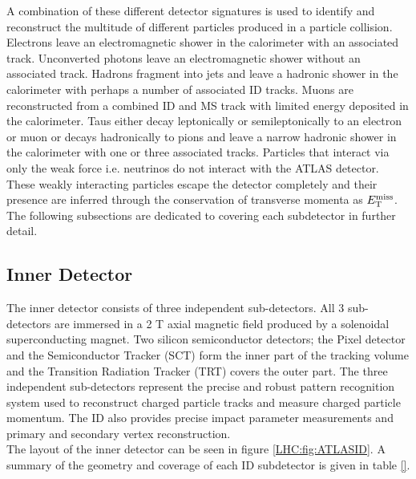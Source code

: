 \indent A combination of these different detector signatures is used to identify and reconstruct the multitude of different particles produced in a particle collision.  Electrons leave an electromagnetic shower in the calorimeter with an associated track.  Unconverted photons leave an electromagnetic shower without an associated track.  Hadrons fragment into jets and leave a hadronic shower in the calorimeter with perhaps a number of associated ID tracks.  Muons are reconstructed from a combined ID and MS track with limited energy deposited in the calorimeter.  Taus either decay leptonically or semileptonically to an electron or muon or decays hadronically to pions and leave a narrow hadronic shower in the calorimeter with one or three associated tracks.  Particles that interact via only the weak force i.e. neutrinos do not interact with the ATLAS detector.  These weakly interacting particles escape the detector completely and their presence are inferred through the conservation of transverse momenta as $E_{\mathrm{T}}^{\mathrm{miss}}$.\\

\indent The following subsections are dedicated to covering each subdetector in further detail. \\

\subsection{ Inner Detector }
\label{LHC:ID}

\indent The inner detector consists of three independent sub-detectors.  All 3 sub-detectors are immersed in a 2 T axial magnetic field produced by a solenoidal superconducting magnet.  Two silicon semiconductor detectors; the Pixel detector and the Semiconductor Tracker (SCT) form the inner part of the tracking volume and the Transition Radiation Tracker (TRT) covers the outer part.  The three independent sub-detectors represent the precise and robust pattern recognition system used to reconstruct charged particle tracks and measure charged particle momentum.  The ID also provides precise impact parameter measurements and primary and secondary vertex reconstruction.   \\

\indent The layout of the inner detector can be seen in figure \ref{LHC:fig:ATLASID}.  A summary of the geometry and coverage of each ID subdetector is given in table \ref{}.  \\

